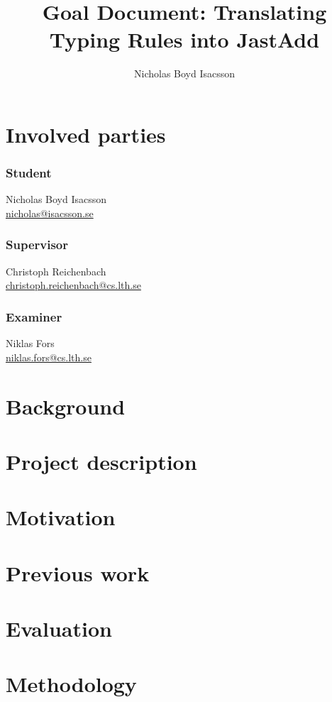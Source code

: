 \documentclass{article}
\title{Goal Document: Translating Typing Rules into JastAdd}
\author{Nicholas Boyd Isacsson}
\begin{document}
\maketitle

\section{Involved parties}
\subsubsection*{Student}
  Nicholas Boyd Isacsson \\
  \href{mailto:nicholas@isacsson.se}{nicholas@isacsson.se}

\subsubsection*{Supervisor}
  Christoph Reichenbach \\
  \href{mailto:christoph.reichenbach@cs.lth.se}{christoph.reichenbach@cs.lth.se}

\subsubsection*{Examiner}
  Niklas Fors \\
  \href{mailto:niklas.fors@cs.lth.se}{niklas.fors@cs.lth.se}

\section{Background}


\section{Project description}


\section{Motivation}


\section{Previous work}


\section{Evaluation}


\section{Methodology}
\end{document}

